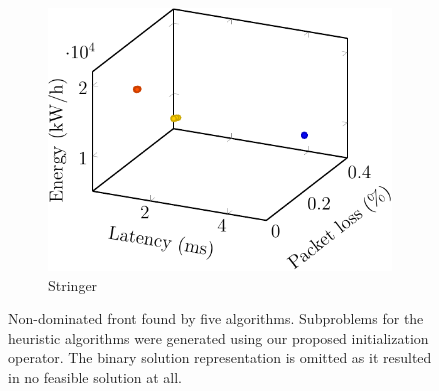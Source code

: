 \begin{figure}[t!]
\begin{subfigure}[b]{0.19\linewidth}
        \includegraphics[width=\textwidth]{graphs/comparison/stringer-crop}
        \caption{Stringer \cite{ChuaWZSH16}}
    \end{subfigure}

    \vspace{1em}
    \caption{Non-dominated front found by five algorithms. Subproblems for the heuristic algorithms were generated using our proposed initialization operator. The binary solution representation is omitted as it resulted in no feasible solution at all.}
    \label{fig:alg_objectives}
\end{figure}

